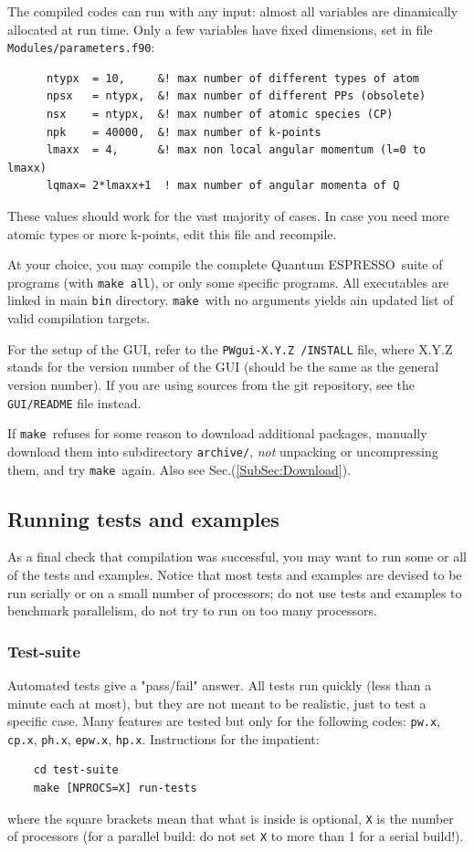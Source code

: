 \documentclass[12pt,a4paper]{article}
\def\qe{{\sc Quantum ESPRESSO}}
\def\pwx{\texttt{pw.x}}
\def\cpx{\texttt{cp.x}}
\def\phx{\texttt{ph.x}}
\def\epwx{\texttt{epw.x}}
\def\make{\texttt{make}}
\begin{document}
The compiled codes can run with any input: almost all variables are
dinamically allocated at run time. Only a few variables have fixed
dimensions, set in file \texttt{Modules/parameters.f90}:
\begin{verbatim}
      ntypx  = 10,     &! max number of different types of atom
      npsx   = ntypx,  &! max number of different PPs (obsolete)
      nsx    = ntypx,  &! max number of atomic species (CP)
      npk    = 40000,  &! max number of k-points
      lmaxx  = 4,      &! max non local angular momentum (l=0 to lmaxx)
      lqmax= 2*lmaxx+1  ! max number of angular momenta of Q
\end{verbatim}
These values should work for the vast majority of cases. In case you need
more atomic types or more k-points, edit this file and recompile.

At your choice, you may compile the complete \qe\ suite of programs
(with \texttt{make all}), or only some specific programs.
All executables are linked in main \texttt{bin} directory.
\make\ with no arguments yields ain updated list of valid compilation targets.

For the setup of the GUI, refer to the \texttt{PWgui-X.Y.Z /INSTALL} file, where
X.Y.Z stands for the version number of the GUI (should be the same as the
general version number). If you are using sources from the git repository, see
the \texttt{GUI/README} file instead.

If \make\ refuses for some reason to download additional
packages, manually download them into subdirectory
\texttt{archive/}, {\em not} unpacking or uncompressing them,
and try \make\ again. Also see Sec.(\ref{SubSec:Download}).

\subsection{Running tests and examples}
\label{SubSec:TestsExamples}

As a final check that compilation was successful, you may want to run some or
all of the tests and examples.
Notice that most tests and examples are devised to be run serially
or on a small number of processors; do not use tests and examples
to benchmark parallelism, do not try to run on too many processors.

\subsubsection{Test-suite}
Automated tests give a "pass/fail" answer. All tests run quickly
(less than a minute each at most), but they are not meant to be realistic,
just to test a specific case. Many features are tested but only for
the following codes: \pwx, \cpx, \phx, \epwx, \texttt{hp.x}.
Instructions for the impatient:
\begin{verbatim}
    cd test-suite
    make [NPROCS=X] run-tests
\end{verbatim}
where the square brackets mean that what is inside is optional, \texttt{X} 
is the number of processors (for a parallel build: do not set \texttt{X}
to more than 1 for a serial build!).
\end{document}
